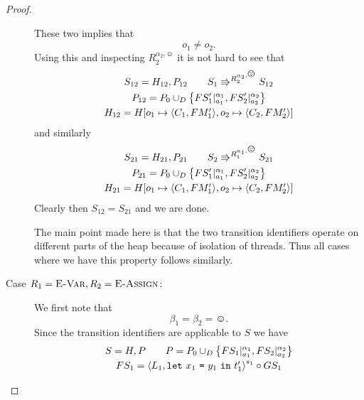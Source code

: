 \begin{proof}
\begin{description}
      These two implies that
      \begin{equation}
        o_1 \neq o_2.
      \end{equation}
      Using this and inspecting $R_2^{\alpha_2, \smiley}$ it is not hard to see
      that 
      \begin{equation}
        \begin{gathered}
          S_{12} = H_{12}, P_{12} \andalso S_1 \Rrightarrow^{R_2^{\alpha_2,
          \smiley}} S_{12}
          \\
          P_{12} = P_0 \cup_D \left\{ FS'_1|_{a_1}^{\alpha_1},
          FS'_2|_{a_2}^{\alpha_2} \right\} \\
          H_{12} = H[o_1 \mapsto \Obj{C_1, FM'_1}, o_2 \mapsto \Obj{C_2, FM'_2}]
        \end{gathered}
      \end{equation}
      and similarly 
      \begin{equation}
        \begin{gathered}
          S_{21} = H_{21}, P_{21} \andalso S_2 \Rrightarrow^{R_1^{\alpha_1,
          \smiley}} S_{21}
          \\
          P_{21} = P_0 \cup_D \left\{ FS'_1|_{a_1}^{\alpha_1},
          FS'_2|_{a_2}^{\alpha_2} \right\} \\
          H_{21} = H[o_1 \mapsto \Obj{C_1, FM'_1}, o_2 \mapsto \Obj{C_2, FM'_2}]
        \end{gathered}
      \end{equation}
      Clearly then $S_{12} = S_{21}$ and we are done.
      \begin{remark}
        The main point made here is that the two transition identifiers operate
        on different parts of the heap because of isolation of threads. Thus all
        cases where we have this property follows similarly.
      \end{remark}
    \item[Case $R_1 = \mbox{{\sc E-Var}}, R_2 = \mbox{{\sc E-Assign}}$:] We first note that
      \begin{equation*}
        \beta_1 = \beta_2 = \smiley.
      \end{equation*}
      Since the transition identifiers are applicable to $S$ we have
      \begin{equation}
        \begin{gathered}
          S = H, P \andalso P = P_0 \cup_D \left\{ FS_1|_{a_1}^{\alpha_1},
          FS_2|_{a_2}^{\alpha_2} \right\} \\
          FS_1 = \xframe{L_1, \Let{x_1}{y_1}{t'_1}}^{s_1} \circ GS_1

\end{gathered}
\end{equation}
\end{description}
\end{proof}
